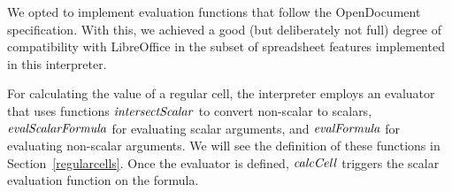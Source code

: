 \resethooks

We opted to implement evaluation functions that follow the OpenDocument
specification. With this, we achieved a good (but deliberately not full)
degree of compatibility with LibreOffice in the subset of spreadsheet features
implemented in this interpreter.

For calculating the value of a regular cell, the interpreter employs an evaluator
that uses functions \ensuremath{\Varid{intersectScalar}} to convert non-scalar to scalars,
\ensuremath{\Varid{evalScalarFormula}} for evaluating scalar arguments, and \ensuremath{\Varid{evalFormula}} for
evaluating non-scalar arguments. We will see the definition of these functions
in Section~\ref{regularcells}. Once the evaluator is defined, \ensuremath{\Varid{calcCell}}
triggers the scalar evaluation function on the formula.

